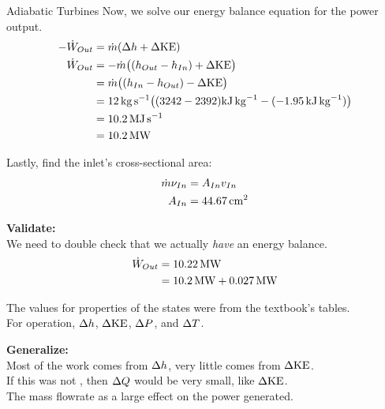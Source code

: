 \begin{example}{Adiabatic Turbines}
  Now, we solve our energy balance equation for the power output.
  \begin{align*}
    -\dot{W}_{Out} &= \dot{m} (\Delta h + \Delta \mathrm{KE}) \\
    \dot{W}_{Out} &= -\dot{m} \bigl( (h_{Out} - h_{In}) + \Delta \mathrm{KE} \bigr) \\
                            &= \dot{m} \bigl( (h_{In} - h_{Out}) - \Delta \mathrm{KE} \bigr) \\
                            &= \SI{12}{\kilo\gram\per\second} \bigl( (3242 - 2392)\si{\kilo\joule\per\kilo\gram} - (-\SI{1.95}{\kilo\joule\per\kilo\gram}) \bigr) \\
                            &= \SI{10.2}{\mega\joule\per\second} \\
                            &= \SI{10.2}{\mega\watt}
  \end{align*}

  Lastly, find the inlet's cross-sectional area:
  \begin{align*}
    \dot{m} \nu_{In} &= A_{In} v_{In} \\
    A_{In} &= \SI{44.67}{\centi\meter\squared}
  \end{align*}

  \textbf{Validate:} \\
  We need to double check that we actually \textit{have} an energy balance.
  \begin{align*}
    \dot{W}_{Out} &= \SI{10.22}{\mega\watt} \\
    &= \SI{10.2}{\mega\watt} + \SI{0.027}{\mega\watt}
  \end{align*}

  The values for properties of the states were from the textbook's tables.\\
  For  operation, $\Delta h$, $\Delta \mathrm{KE}$, $\Delta P$, and $\Delta T$.

  \textbf{Generalize:} \\
  Most of the work comes from $\Delta h$, very little comes from $\Delta \mathrm{KE}$. \\
  If this was not , then $\Delta Q$ would be very small, like $\Delta \mathrm{KE}$. \\
  The mass flowrate as a large effect on the power generated.
\end{example}


